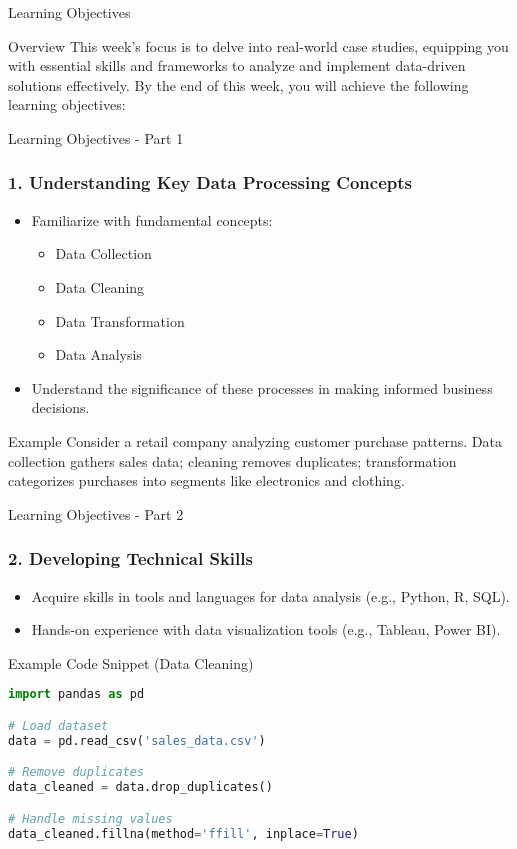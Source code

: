 \documentclass[aspectratio=169]{beamer}
\begin{document}
\begin{frame}{Learning Objectives}
    \begin{block}{Overview}
        This week’s focus is to delve into real-world case studies, equipping you with essential skills and frameworks to analyze and implement data-driven solutions effectively. By the end of this week, you will achieve the following learning objectives:
    \end{block}
\end{frame}

\begin{frame}{Learning Objectives - Part 1}
    \frametitle{1. Understanding Key Data Processing Concepts}
    \begin{itemize}
        \item Familiarize with fundamental concepts: 
        \begin{itemize}
            \item Data Collection
            \item Data Cleaning
            \item Data Transformation
            \item Data Analysis
        \end{itemize}
        \item Understand the significance of these processes in making informed business decisions.
    \end{itemize}
    
    \begin{block}{Example}
        Consider a retail company analyzing customer purchase patterns. Data collection gathers sales data; cleaning removes duplicates; transformation categorizes purchases into segments like electronics and clothing.
    \end{block}
\end{frame}

\begin{frame}{Learning Objectives - Part 2}
    \frametitle{2. Developing Technical Skills}
    \begin{itemize}
        \item Acquire skills in tools and languages for data analysis (e.g., Python, R, SQL).
        \item Hands-on experience with data visualization tools (e.g., Tableau, Power BI).
    \end{itemize}

    \begin{block}{Example Code Snippet (Data Cleaning)}
        \begin{lstlisting}[language=Python]
import pandas as pd

# Load dataset
data = pd.read_csv('sales_data.csv')

# Remove duplicates
data_cleaned = data.drop_duplicates()

# Handle missing values
data_cleaned.fillna(method='ffill', inplace=True)
        \end{lstlisting}
    \end{block}
\end{frame}
\end{document}
